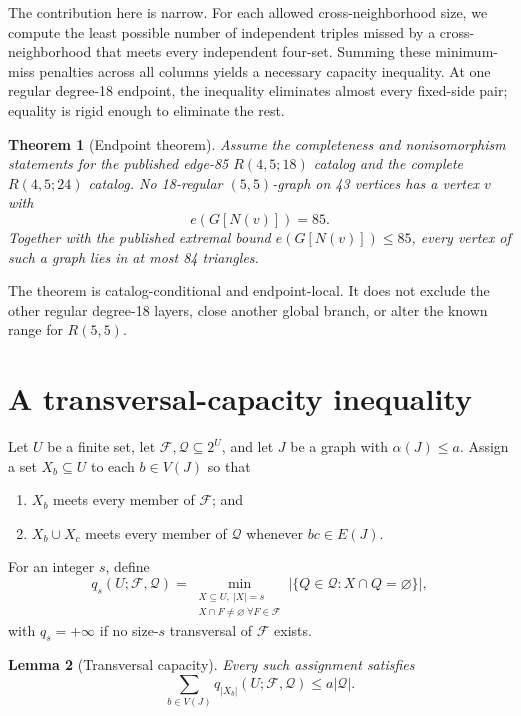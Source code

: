 \documentclass[11pt]{article}
\newtheorem{theorem}{Theorem}
\newtheorem{lemma}[theorem]{Lemma}
\newcommand{\Q}{\mathcal Q}
\newcommand{\F}{\mathcal F}
\begin{document}
The contribution here is narrow.  For each allowed cross-neighborhood size,
we compute the least possible number of independent triples missed by a
cross-neighborhood that meets every independent four-set.  Summing these
minimum-miss penalties across all columns yields a necessary capacity
inequality.  At one regular degree-18 endpoint, the inequality eliminates
almost every fixed-side pair; equality is rigid enough to eliminate the
rest.

\begin{theorem}[Endpoint theorem]\label{thm:endpoint}
Assume the completeness and nonisomorphism statements for the published
edge-85 $R(4,5;18)$ catalog and the complete $R(4,5;24)$ catalog.  No
18-regular $(5,5)$-graph on 43 vertices has a vertex $v$ with
\[
 e(G[N(v)])=85.
\]
Together with the published extremal bound $e(G[N(v)])\leq85$, every vertex
of such a graph lies in at most 84 triangles.
\end{theorem}

The theorem is catalog-conditional and endpoint-local.  It does not exclude
the other regular degree-18 layers, close another global branch, or alter the
known range for $R(5,5)$.

\section{A transversal-capacity inequality}

Let $U$ be a finite set, let $\F,\Q\subseteq2^U$, and let $J$ be a graph with
$\alpha(J)\leq a$.  Assign a set $X_b\subseteq U$ to each $b\in V(J)$ so
that
\begin{enumerate}
\item $X_b$ meets every member of $\F$; and
\item $X_b\cup X_c$ meets every member of $\Q$ whenever $bc\in E(J)$.
\end{enumerate}
For an integer $s$, define
\begin{equation}\label{eq:profile}
 q_s(U;\F,\Q)=
 \min_{\substack{X\subseteq U,\ |X|=s\\
                  X\cap F\ne\varnothing\ \forall F\in\F}}
 \bigl|\{Q\in\Q:X\cap Q=\varnothing\}\bigr|,
\end{equation}
with $q_s=+\infty$ if no size-$s$ transversal of $\F$ exists.

\begin{lemma}[Transversal capacity]\label{lem:capacity}
Every such assignment satisfies
\begin{equation}\label{eq:capacity}
 \sum_{b\in V(J)}q_{|X_b|}(U;\F,\Q)\leq a|\Q|.
\end{equation}
\end{lemma}
\end{document}
